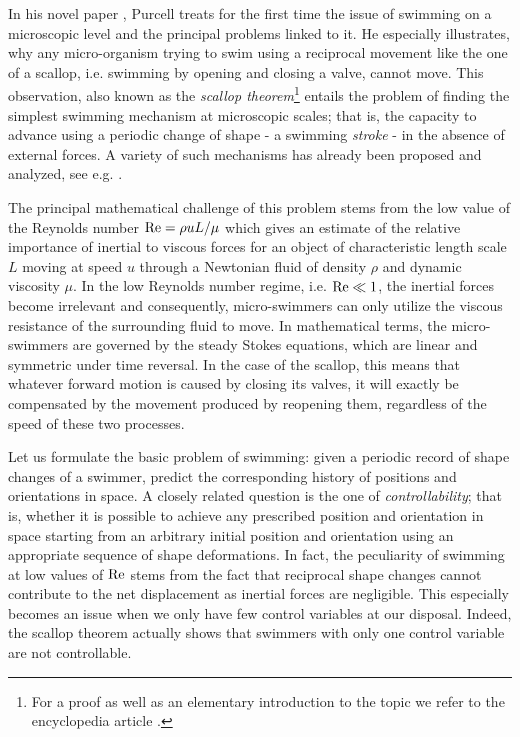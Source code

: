 
In his novel paper \cite{Purcell1977}, Purcell treats for the first time the issue of swimming on a microscopic level and the principal problems linked to it. He especially illustrates, why any micro-organism trying to swim using a reciprocal movement like the one of a scallop, i.e. swimming by opening and closing a valve, cannot move. This observation, also known as the \emph{scallop theorem}\footnote{For a proof as well as an elementary introduction to the topic we refer to the encyclopedia article \cite{DeSimone2011}.} entails the problem of finding the simplest swimming mechanism at microscopic scales; that is, the capacity to advance using a periodic change of  shape - a swimming \emph{stroke} - in  the absence of external forces. A variety of such mechanisms has already been proposed and analyzed, see e.g. \cite{Alouges2013, Najafi2004, Purcell1977}.


The principal mathematical challenge of this problem stems from the low value of the Reynolds number $\operatorname{Re} = \rho u L/\mu$ which gives an estimate of the relative importance of inertial to viscous forces for an object of characteristic length scale $L$ moving at speed $u$ through a Newtonian fluid of density $\rho$ and dynamic viscosity $\mu$. In the low Reynolds number regime, i.e. $\operatorname{Re} \ll 1$, the inertial forces become irrelevant and consequently, micro-swimmers can only utilize the viscous resistance of the surrounding fluid to move. In mathematical terms, the micro-swimmers are governed by the steady Stokes equations, which are linear and symmetric under time reversal. In the case of the scallop, this means that whatever forward motion is caused by closing its valves, it will exactly be compensated by the movement produced by reopening them, regardless of the speed of these two processes.

Let us formulate the basic problem of swimming: given a periodic record of shape changes of a swimmer, predict the corresponding history of positions and orientations in space. A closely related question is the one of \emph{controllability}; that is, whether it is possible to achieve any prescribed position and orientation in space starting from an arbitrary initial position and orientation using an appropriate sequence of shape deformations. In fact, the peculiarity of swimming at low values of $\operatorname{Re}$ stems from the fact that reciprocal shape changes cannot contribute to the net displacement as inertial forces are negligible. This especially becomes an issue when we only have few control variables at our disposal. Indeed, the scallop theorem actually shows that swimmers with only one control variable are not controllable.


